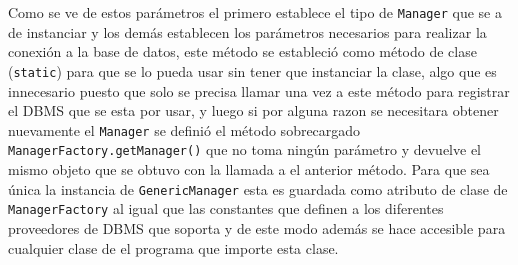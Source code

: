 Como se ve de estos parámetros el primero establece el tipo de \verb=Manager= que se a de instanciar y los demás establecen los parámetros necesarios para realizar la conexión a la base de datos, este método se estableció como método de clase (\verb=static=) para que se lo pueda usar sin tener que instanciar la clase, algo que es innecesario puesto que solo se precisa llamar una vez a este método para registrar el DBMS que se esta por usar, y luego si por alguna razon se necesitara obtener nuevamente el \verb=Manager= se definió el método sobrecargado \verb=ManagerFactory.getManager()= que no toma ningún parámetro y devuelve el mismo objeto que se obtuvo con la llamada a el anterior método. Para que sea única la instancia de \verb=GenericManager= esta es guardada como atributo de clase de \verb=ManagerFactory= al igual que las constantes que definen a los diferentes proveedores de DBMS que soporta \jj y de este modo además se hace accesible para cualquier clase de el programa que importe esta clase.
%
